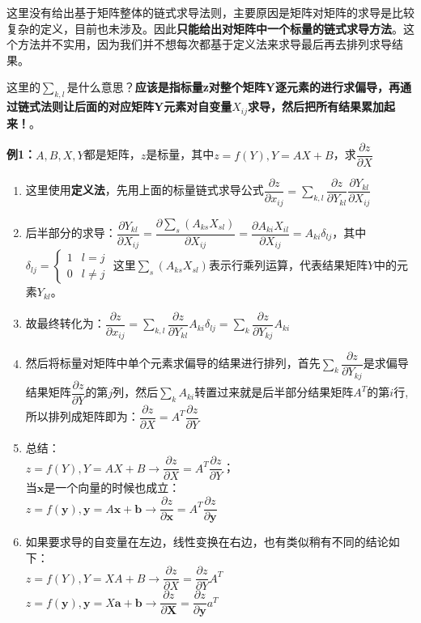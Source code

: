 \documentclass[UTF8]{article}
\begin{document}
    这里没有给出基于矩阵整体的链式求导法则，主要原因是矩阵对矩阵的求导是比较复杂的定义，目前也未涉及。因此\textbf{只能给出对矩阵中一个标量的链式求导方法}。这个方法并不实用，因为我们并不想每次都基于定义法来求导最后再去排列求导结果。


    这里的$\sum_{k,l}$是什么意思？\textbf{应该是指标量z对整个矩阵Y逐元素的进行求偏导，再通过链式法则让后面的对应矩阵Y元素对自变量$X_{ij}$求导，然后把所有结果累加起来！}。


    \textbf{例1：}$A,B,X,Y$都是矩阵，$z$是标量，其中$z=f(Y), Y=A X+B$，求$\dfrac{\partial z}{\partial X}$

    \begin{enumerate}
        \item 这里使用\textbf{定义法}，先用上面的标量链式求导公式$\dfrac{\partial z}{\partial x_{i j}}=\sum_{k, l} \dfrac{\partial z}{\partial Y_{k l}} \dfrac{\partial Y_{k l}}{\partial X_{i j}}$
        \item 后半部分的求导：$\dfrac{\partial Y_{k l}}{\partial X_{i j}}=\dfrac{\partial \sum_{s}\left(A_{k s} X_{s l}\right)}{\partial X_{i j}}=\dfrac{\partial A_{k i} X_{i l}}{\partial X_{i j}}=A_{k i} \delta_{l j}$，其中$\delta_{lj}=\left\{\begin{array}{ll}1 & l=j \\ 0 & l \neq j\end{array}\right.$ 这里$\sum_{s}(A_{k s} X_{s l})$表示行乘列运算，代表结果矩阵$Y$中的元素$Y_{kl}$。
        \item 故最终转化为：$\dfrac{\partial z}{\partial x_{i j}}=\sum_{k, l} \dfrac{\partial z}{\partial Y_{k l}} A_{k i} \delta_{l j}=\sum_{k} \dfrac{\partial z}{\partial Y_{k j}} A_{k i}$
        \item 然后将标量对矩阵中单个元素求偏导的结果进行排列，首先$\sum_{k} \dfrac{\partial z}{\partial Y_{k j}}$是求偏导结果矩阵$\dfrac{\partial z}{\partial Y}$的第$j$列，然后$\sum_{k} A_{ki}$转置过来就是后半部分结果矩阵$A^T$的第$i$行,所以排列成矩阵即为：$\dfrac{\partial z}{\partial X}=A^{T} \dfrac{\partial z}{\partial Y}$
        \item 总结： \\ $z=f(Y), Y=A X+B \rightarrow \dfrac{\partial z}{\partial X}=A^{T} \dfrac{\partial z}{\partial Y}$；\\ 当$\bm{x}$是一个向量的时候也成立：\\ $z=f(\mathbf{y}), \mathbf{y}=A \mathbf{x}+\mathbf{b} \rightarrow \dfrac{\partial z}{\partial \mathbf{x}}=A^{T} \dfrac{\partial z}{\partial \mathbf{y}}$
        \item 如果要求导的自变量在左边，线性变换在右边，也有类似稍有不同的结论如下：\\ $z=f(Y), Y=X A+B \rightarrow \dfrac{\partial z}{\partial X}=\dfrac{\partial z}{\partial Y} A^{T}$ \\ $z=f(\mathbf{y}), \mathbf{y}=X \mathbf{a}+\mathbf{b} \rightarrow \dfrac{\partial z}{\partial \mathbf{X}}=\dfrac{\partial z}{\partial \mathbf{y}} a^{T}$
    \end{enumerate}
\end{document}
